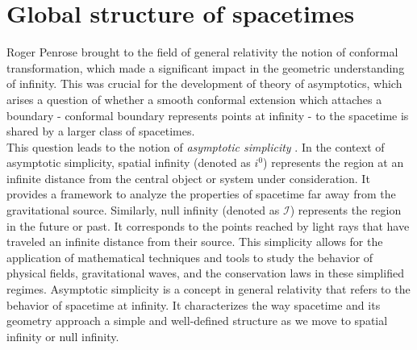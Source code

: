 \section{Global structure of spacetimes}
\label{section:Global structure of spacetimes}

Roger Penrose brought to the field of general relativity the notion of conformal transformation, which made a significant impact in the geometric understanding of infinity. This was crucial for the development of theory of asymptotics, which arises a question of whether a smooth conformal extension which attaches a boundary - conformal boundary represents points at infinity - to the spacetime is shared by a larger class of spacetimes. \\

This question leads to the notion of \textit{asymptotic simplicity} \cite{Val16}. In the context of asymptotic simplicity, spatial infinity (denoted as $i^0$) represents the region at an infinite distance from the central object or system under consideration. It provides a framework to analyze the properties of spacetime far away from the gravitational source. Similarly, null infinity (denoted as $\mathscr{I}$) represents the region in the future or past. It corresponds to the points reached by light rays that have traveled an infinite distance from their source. This simplicity allows for the application of mathematical techniques and tools to study the behavior of physical fields, gravitational waves, and the conservation laws in these simplified regimes.
Asymptotic simplicity is a concept in general relativity that refers to the behavior of spacetime at infinity. It characterizes the way spacetime and its geometry approach a simple and well-defined structure as we move to spatial infinity or null infinity. \\

